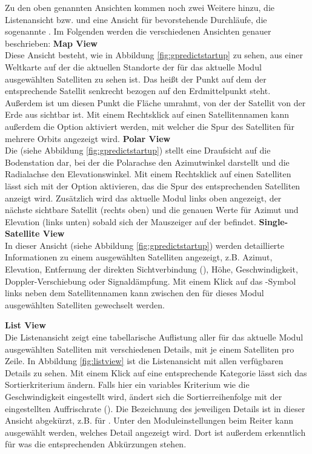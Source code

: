 Zu den oben genannten Ansichten kommen noch zwei Weitere hinzu, die Listenansicht bzw.  und eine Ansicht für bevorstehende Durchläufe, die sogenannte . Im Folgenden werden die verschiedenen Ansichten genauer beschrieben:\newpar
\textbf{Map View}\\
Diese Ansicht besteht, wie in Abbildung \ref{fig:gpredictstartup} zu sehen, aus einer Weltkarte auf der die aktuellen Standorte der für das aktuelle Modul ausgewählten Satelliten zu sehen ist. Das heißt der Punkt auf dem der entsprechende Satellit senkrecht bezogen auf den Erdmittelpunkt steht. Außerdem ist um diesen Punkt die Fläche umrahmt, von der der Satellit von der Erde aus sichtbar ist. Mit einem Rechtsklick auf einen Satellitennamen kann außerdem die Option  aktiviert werden, mit welcher die Spur des Satelliten für mehrere Orbits angezeigt wird.\newpar
\textbf{Polar View}\\
Die  (siehe Abbildung \ref{fig:gpredictstartup}) stellt eine Draufsicht auf die Bodenstation dar, bei der die Polarachse den Azimutwinkel darstellt und die Radialachse den Elevationswinkel. Mit einem Rechtsklick auf einen Satelliten lässt sich mit der Option  aktivieren, das die Spur des entsprechenden Satelliten anzeigt wird. Zusätzlich wird das aktuelle Modul links oben angezeigt, der nächste sichtbare Satellit (rechts oben) und die genauen Werte für Azimut und Elevation (links unten) sobald sich der Mauszeiger auf der  befindet.\newpar
\textbf{Single-Satellite View}\\
In dieser Ansicht (siehe Abbildung \ref{fig:gpredictstartup}) werden detaillierte Informationen zu einem ausgewählten Satelliten angezeigt, z.B. Azimut, Elevation, Entfernung der direkten Sichtverbindung (), Höhe, Geschwindigkeit, Doppler-Verschiebung oder Signaldämpfung. Mit einem Klick auf das \myvsymbol-Symbol links neben dem Satellitennamen kann zwischen den für dieses Modul ausgewählten Satelliten gewechselt werden.

\clearpage

\textbf{List View}\\
Die Listenansicht zeigt eine tabellarische Auflistung aller für das aktuelle Modul ausgewählten Satelliten mit verschiedenen Details, mit je einem Satelliten pro Zeile. In Abbildung \ref{fig:listview} ist die Listenansicht mit allen verfügbaren Details zu sehen. Mit einem Klick auf eine entsprechende Kategorie lässt sich das Sortierkriterium ändern. Falls hier ein variables Kriterium wie die Geschwindigkeit eingestellt wird, ändert sich die Sortierreihenfolge mit der eingestellten Auffrischrate (). Die Bezeichnung des jeweiligen Details ist in dieser Ansicht abgekürzt, z.B.  für . Unter den Moduleinstellungen beim Reiter  kann ausgewählt werden, welches Detail angezeigt wird. Dort ist außerdem erkenntlich für was die entsprechenden Abkürzungen stehen.

